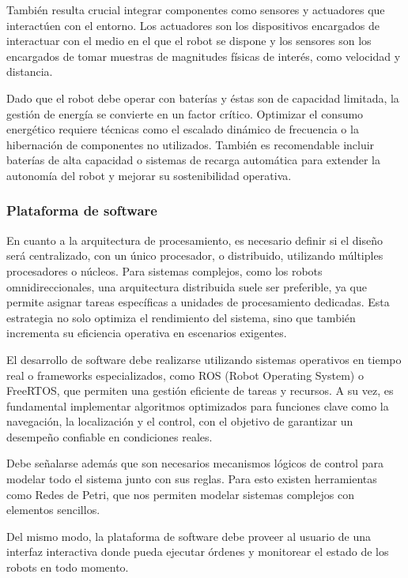 También resulta crucial integrar componentes como sensores y actuadores que interactúen con el entorno. Los actuadores son los dispositivos encargados de interactuar con el medio en el que el robot se dispone y los sensores son los encargados de tomar muestras de magnitudes físicas de interés, como velocidad y distancia. \cite{lee2017introduction}

Dado que el robot debe operar con baterías y éstas son de capacidad limitada, la gestión de energía se convierte en un factor crítico. Optimizar el consumo energético requiere técnicas como el escalado dinámico de frecuencia o la hibernación de componentes no utilizados. También es recomendable incluir baterías de alta capacidad o sistemas de recarga automática para extender la autonomía del robot y mejorar su sostenibilidad operativa.


\subsubsection{Plataforma de software}
En cuanto a la arquitectura de procesamiento, es necesario definir si el diseño será centralizado, con un único procesador, o distribuido, utilizando múltiples procesadores o núcleos. Para sistemas complejos, como los robots omnidireccionales, una arquitectura distribuida suele ser preferible, ya que permite asignar tareas específicas a unidades de procesamiento dedicadas. Esta estrategia no solo optimiza el rendimiento del sistema, sino que también incrementa su eficiencia operativa en escenarios exigentes. \cite{marwedelcyberphysical}

El desarrollo de software debe realizarse utilizando sistemas operativos en tiempo real o frameworks especializados, como ROS (Robot Operating System) o FreeRTOS, que permiten una gestión eficiente de tareas y recursos. A su vez, es fundamental implementar algoritmos optimizados para funciones clave como la navegación, la localización y el control, con el objetivo de garantizar un desempeño confiable en condiciones reales.

Debe señalarse además que son necesarios mecanismos lógicos de control para modelar todo el sistema junto con sus reglas. Para esto existen herramientas como Redes de Petri, que nos permiten modelar sistemas complejos con elementos sencillos. \cite{marwedelcyberphysical}

Del mismo modo, la plataforma de software debe proveer al usuario de una interfaz interactiva donde pueda ejecutar órdenes y monitorear el estado de los robots en todo momento.


